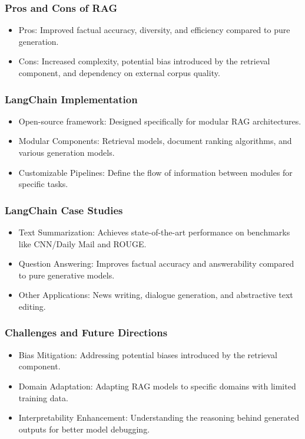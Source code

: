 \begin{frame}[fragile]\frametitle{Pros and Cons of RAG}

\begin{itemize}
\item Pros: Improved factual accuracy, diversity, and efficiency compared to pure generation.
\item Cons: Increased complexity, potential bias introduced by the retrieval component, and dependency on external corpus quality.
\end{itemize}	

\end{frame}

\begin{frame}[fragile]\frametitle{LangChain Implementation}

\begin{itemize}
\item Open-source framework: Designed specifically for modular RAG architectures.
\item Modular Components: Retrieval models, document ranking algorithms, and various generation models.
\item Customizable Pipelines: Define the flow of information between modules for specific tasks.
\end{itemize}	

\end{frame}

\begin{frame}[fragile]\frametitle{LangChain Case Studies}

\begin{itemize}
\item Text Summarization: Achieves state-of-the-art performance on benchmarks like CNN/Daily Mail and ROUGE.
\item Question Answering: Improves factual accuracy and answerability compared to pure generative models.
\item Other Applications: News writing, dialogue generation, and abstractive text editing.
\end{itemize}	

\end{frame}


\begin{frame}[fragile]\frametitle{Challenges and Future Directions}

\begin{itemize}
\item Bias Mitigation: Addressing potential biases introduced by the retrieval component.
\item Domain Adaptation: Adapting RAG models to specific domains with limited training data.
\item Interpretability Enhancement: Understanding the reasoning behind generated outputs for better model debugging.
\end{itemize}	

\end{frame}